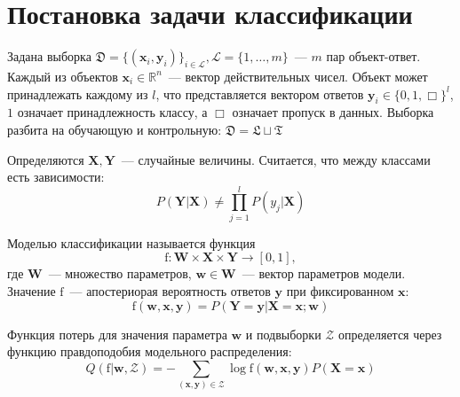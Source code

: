 \documentclass[12pt,twoside]{article}
\newcommand{\x}{\mathbf{x}}
\newcommand{\w}{\mathbf{w}}
\newcommand{\W}{\mathbf{W}}
\newcommand{\y}{\mathbf{y}}
\newcommand{\X}{\mathbf{X}}
\newcommand{\Y}{\mathbf{Y}}
\newcommand{\fx}{\mathbf{f}}
\newcommand{\fs}{\mbox{f}}
\begin{document}
\section{Постановка задачи классификации}
Задана выборка $\mathfrak{D}=\{(\x_i,\y_i)\}_{i\in \mathcal{L}}, \mathcal{L}=\{1,\dots, m\}$~--- $m$ пар объект-ответ. Каждый из объектов $\x_i\in \mathbb{R}^n$~--- вектор действительных чисел. Объект может принадлежать каждому из $l$, что представляется вектором ответов $\y_i\in \{0,1,\Box\}^l$, $1$ означает принадлежность классу, а $\Box$ означает пропуск в данных. Выборка разбита на обучающую и контрольную: $\mathfrak{D}=\mathfrak{L}\sqcup\mathfrak{T}$


Определяются $\X, \Y$~--- случайные величины.
Считается, что между классами есть зависимости:
$$P(\Y|\X)\neq \prod_{j=1}^l P(y_j|\X)$$



Моделью классификации называется функция
$$\fs\colon \W\times\X\times\Y\to [0,1],$$
где $\W$~--- множество параметров, $\w\in\W$~--- вектор параметров модели. Значение $\fs$~--- апостериорая вероятность ответов $\y$ при фиксированном $\x$:
$$\fs(\w,\x,\y)=P(\Y=\y|\X=\x;\w)$$


Функция потерь для значения параметра $\w$ и подвыборки $\mathcal{Z}$ определяется через функцию правдоподобия модельного распределения:
$$Q(\fs|\w, \mathcal{Z})=-\sum_{(\x,\y)\in\mathcal{Z}}\log \fs(\w,\x,\y)P(\X=\x)$$
\end{document}
